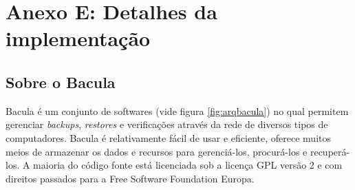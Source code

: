 
% 
% 
% 
% 

\section{Anexo E: Detalhes da implementação} \label{sec:anexoe}

\subsection{Sobre o Bacula}
Bacula é um conjunto de softwares (vide figura \ref{fig:arqbacula}) no qual permitem gerenciar \textit{backups}, \textit{restores} e verificações através da rede de diversos tipos de computadores. Bacula é relativamente fácil de usar e eficiente, oferece muitos meios de armazenar os dados e recursos para gerenciá-los, procurá-los e recuperá-los. A maioria do código fonte está licenciada sob a licença GPL versão 2 e com direitos passados para a Free Software Foundation Europa.

